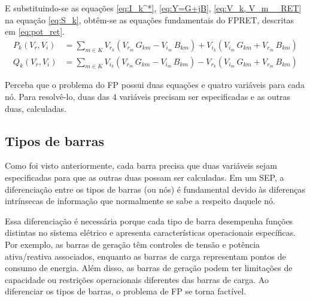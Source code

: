 E substituindo-se as equações \eqref{eq:I_k^*}, \eqref{eq:Y=G+jB}, \eqref{eq:V_k, V_m__RET} na equação \eqref{eq:S_k}, obtêm-se as equações fundamentais do \ac{FPRET}, descritas em \eqref{eq:pot_ret}.
\begin{equation} \label{eq:pot_ret}
    \begin{split}
        P_k(V_r, V_i) &= \sum_{m \in K}V_{r_k}\left(V_{r_m}\,G_{km} - V_{i_m}\,B_{km}\right)+V_{i_k}\left(V_{i_m}\,G_{km} + V_{r_m}\,B_{km}\right)\\
        Q_k(V_r, V_i) &= \sum_{m \in K}V_{i_k}\left(V_{r_m}\,G_{km} - V_{i_m}\,B_{km}\right)-V_{r_k}\left(V_{i_m}\,G_{km}+V_{r_m}\,B_{km}\right)
    \end{split}
\end{equation}

Perceba que o problema do \ac{FP} possui duas equações e quatro variáveis para cada nó. Para resolvê-lo, duas das 4 variáveis precisam ser especificadas e as outras duas, calculadas.

\subsection{Tipos de barras}

Como foi visto anteriormente, cada barra precisa que duas variáveis sejam especificadas para que as outras duas possam ser calculadas. Em um \ac{SEP}, a diferenciação entre os tipos de barras (ou nós) é fundamental devido às diferenças intrínsecas de informação que normalmente se sabe a respeito daquele nó.

Essa diferenciação é necessária porque cada tipo de barra desempenha funções distintas no sistema elétrico e apresenta características operacionais específicas. Por exemplo, as barras de geração têm controles de tensão e potência ativa/reativa associados, enquanto as barras de carga representam pontos de consumo de energia. Além disso, as barras de geração podem ter limitações de capacidade ou restrições operacionais diferentes das barras de carga. Ao diferenciar os tipos de barras, o problema de \ac{FP} se torna factível.

